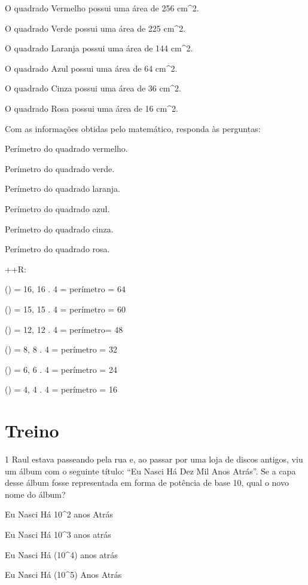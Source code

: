 O quadrado Vermelho possui uma área de 256 cm^2.

O quadrado Verde possui uma área de 225 cm^2.

O quadrado Laranja possui uma área de 144 cm^2.

O quadrado Azul possui uma área de 64 cm^2.

O quadrado Cinza possui uma área de 36 cm^2.

O quadrado Rosa possui uma área de 16 cm^2.

Com as informações obtidas pelo matemático, responda às perguntas:

\item Perímetro do quadrado vermelho.
\item Perímetro do quadrado verde.
\item Perímetro do quadrado laranja.
\item Perímetro do quadrado azul.
\item Perímetro do quadrado cinza.
\item Perímetro do quadrado rosa.


++R:
\item
  () = 16, 16 . 4 = perímetro = 64
\item
  () = 15, 15 . 4 = perímetro = 60
\item
  () = 12, 12 . 4 = perímetro= 48
\item
  () = 8, 8 . 4 = perímetro = 32
\item
  () = 6, 6 . 4 = perímetro = 24
\item
  () = 4, 4 . 4 = perímetro = 16

\section{Treino}

\num{1} Raul estava passeando pela rua e, ao passar por uma loja de discos
antigos, viu um álbum com o seguinte título: ``Eu Nasci Há Dez Mil Anos
Atrás''. Se a capa desse álbum fosse representada em forma de potência
de base 10, qual o novo nome do álbum?
\item Eu Nasci Há 10^2 anos Atrás
\item Eu Nasci Há 10^3 anos atrás
\item Eu Nasci Há (10^4) anos atrás
\item Eu Nasci Há (10^5) Anos Atrás

